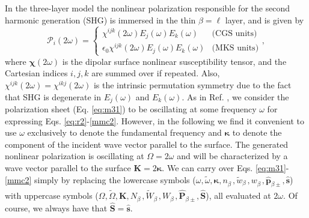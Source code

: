 In the three-layer model the nonlinear polarization responsible for the second
harmonic generation (SHG) is immersed in the thin $\beta=\ell$ layer, and is
given by
\begin{equation}\label{eq:tres}
\mathcal{P}_{i}(2\omega)=
\left\{
\begin{array}{cc}
\chi^{ijk}(2\omega)E_{j}(\omega)E_{k}(\omega)             & \text{(CGS units)}\\
\epsilon_{0}\chi^{ijk}(2\omega)E_{j}(\omega)E_{k}(\omega) & \text{(MKS units)}
\end{array}
\right.,
\end{equation}
where $\boldsymbol{\chi}(2\omega)$ is the dipolar surface nonlinear
susceptibility tensor, and the Cartesian indices $i,j,k$ are summed over if
repeated. Also, $\chi^{ijk}(2\omega) = \chi^{ikj}(2\omega)$ is the intrinsic
permutation symmetry due to the fact that SHG is degenerate in $E_{j}(\omega)$
and $E_{k}(\omega)$. As in Ref. \cite{mizrahiJOSA88}, we consider the
polarization sheet (Eq. \eqref{eq:m31}) to be oscillating at some frequency
$\omega$ for expressing Eqs. \eqref{eq:r2}-\eqref{mmc2}. However, in the following
we find it convenient to use $\omega$ exclusively to denote the fundamental
frequency and $\boldsymbol{\kappa}$ to denote the component of the incident wave
vector parallel to the surface. The generated nonlinear polarization is
oscillating at $\Omega = 2\omega$ and will be characterized by a wave vector
parallel to the surface $\mathbf{K} = 2\boldsymbol{\kappa}$. We can carry over
Eqs. \eqref{eq:m31}-\eqref{mmc2} simply by replacing the lowercase symbols
($\omega,\tilde{\omega},\boldsymbol{\kappa},n^{\phantom{A}}_{\beta},
\tilde{w}^{\phantom{A}}_{\beta},w^{\phantom{A}}_{\beta},
\hat{\mathbf{p}}_{\beta\pm},\hat{\mathbf{s}}$) with uppercase symbols 
($\Omega,\tilde{\Omega},\mathbf{K},N^{\phantom{A}}_{\beta},
\tilde{W}^{\phantom{A}}_{\beta},W^{\phantom{A}}_{\beta},
\hat{\mathbf{P}}_{\beta\pm},\hat{\mathbf{S}}$), all evaluated at $2\omega$. 
Of course, we always have that $\hat{\mathbf{S}}=\hat{\mathbf{s}}$.

